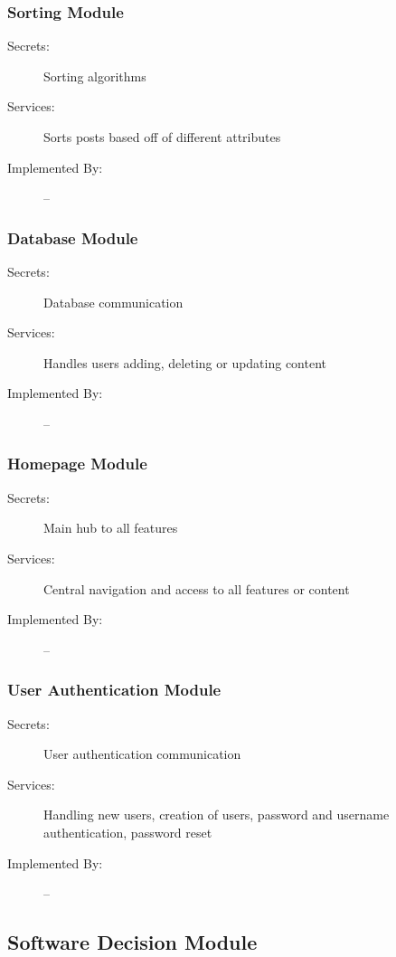\documentclass[12pt,fleqn]{article}
\begin{document}
\subsubsection{Sorting Module}
\begin{description}
\item[Secrets:] Sorting algorithms
\item[Services:] Sorts posts based off of different attributes
\item[Implemented By:] --
\end{description}

\subsubsection{Database Module}
\begin{description}
\item[Secrets:] Database communication
\item[Services:] Handles users adding, deleting or updating content
\item[Implemented By:] --
\end{description}

\subsubsection{Homepage Module}
\begin{description}
\item[Secrets:] Main hub to all features
\item[Services:] Central navigation and access to all features or content
\item[Implemented By:] --
\end{description}

\subsubsection{User Authentication Module}
\begin{description}
\item[Secrets: ] User authentication communication
\item[Services: ] Handling new users, creation of users, password and username authentication, password reset
\item[Implemented By: ] --
\end{description}


\subsection{Software Decision Module}
\end{document}

